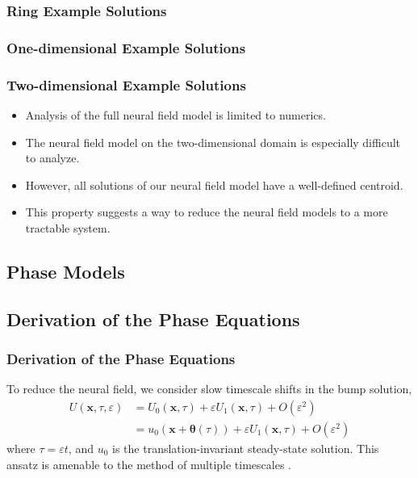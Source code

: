 \documentclass{beamer}
\newcommand{\x}{\mathbf{x}}
\newcommand{\q}{\boldsymbol{\theta}}
\newcommand{\ve}{\varepsilon}
\begin{document}
\begin{frame}
 \frametitle{Ring Example Solutions}
\begin{center}
\end{center}
\end{frame}

\begin{frame}
\frametitle{One-dimensional Example Solutions}
\begin{center}
\end{center}
\end{frame}


\begin{frame}
\frametitle{Two-dimensional Example Solutions}
\begin{center}
\end{center}
\end{frame}

\begin{frame}
\begin{itemize}
 \item<1-> Analysis of the full neural field model is limited to numerics.
 \item<2-> The neural field model on the two-dimensional domain is especially difficult to analyze.
 \item<3-> However, all solutions of our neural field model have a well-defined centroid.
 \item<4-> This property suggests a way to reduce the neural field models to a more tractable system.
\end{itemize}
\end{frame}

\subsection{Phase Models}



\subsection{Derivation of the Phase Equations}
\begin{frame}
\frametitle{Derivation of the Phase Equations}
To reduce the neural field, we consider slow timescale shifts in the bump solution,
 \begin{align*}
 U(\x,\tau,\ve) &= U_0(\x,\tau) + \varepsilon U_1(\x,\tau) + O(\varepsilon^2)\\
 &= u_0(\x+\q(\tau)) + \varepsilon U_1(\x,\tau) + O(\varepsilon^2)
\end{align*}
where $\tau = \varepsilon t$, and $u_0$ is the translation-invariant steady-state solution. This ansatz is amenable to the method of multiple timescales \cite{keener}.
\end{frame}
\end{document}
